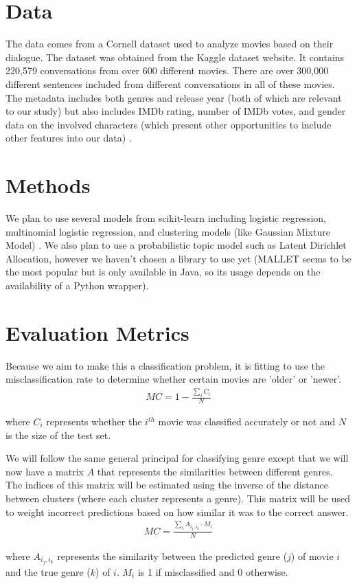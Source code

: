 \documentclass{article} %
\begin{document}
\section{Data}

The data comes from a Cornell dataset used to analyze movies based on their dialogue. The dataset was obtained from the Kaggle dataset website. It contains 220,579 conversations from over 600 different movies. There are over 300,000 different sentences included from different conversations in all of these movies. The metadata includes both genres and release year (both of which are relevant to our study) but also includes IMDb rating, number of IMDb votes, and gender data on the involved characters (which present other opportunities to include other features into our data) \cite{kaggle}.

\section{Methods}

We plan to use several models from scikit-learn including logistic regression, multinomial logistic regression, and clustering models (like Gaussian Mixture Model) \cite{skl}. We also plan to use a probabilistic topic model such as Latent Dirichlet Allocation, however we haven't chosen a library to use yet (MALLET seems to be the most popular but is only available in Java, so its usage depends on the availability of a Python wrapper).

\section{Evaluation Metrics}

Because we aim to make this a classification problem, it is fitting to use the misclassification rate to determine whether certain movies are 'older' or 'newer'.
\begin{align*}
MC = 1 - \frac{ \sum_i C_i }{N}
\end{align*}

where $C_i$ represents whether the $i^{th}$ movie was classified accurately or not and $N$ is the size of the test set.

We will follow the same general principal for classifying genre except that we will now have a matrix $A$ that represents the similarities between different genres. The indices of this matrix will be estimated using the inverse of the distance between clusters (where each cluster represents a genre). This matrix will be used to weight incorrect predictions based on how similar it was to the correct answer.
\begin{align*}
MC = \frac{ \sum_i A_{i_j,i_k} \cdot M_i }{N}
\end{align*}

where $A_{i_j,i_k}$ represents the similarity between the predicted genre ($j$) of movie $i$ and the true genre ($k$) of $i$. $M_i$ is 1 if misclassified and 0 otherwise.



\end{document}
